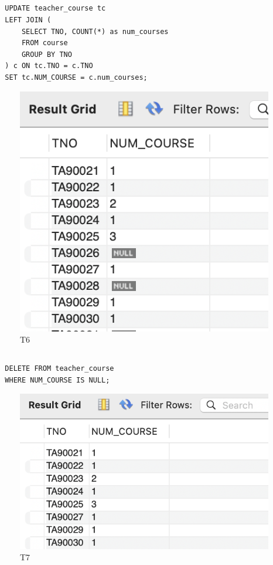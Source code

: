 \documentclass[UTF8]{ctexart}
\begin{document}
\subsection{}
\begin{lstlisting}
  UPDATE teacher_course tc
  LEFT JOIN (
      SELECT TNO, COUNT(*) as num_courses
      FROM course
      GROUP BY TNO
  ) c ON tc.TNO = c.TNO
  SET tc.NUM_COURSE = c.num_courses;
\end{lstlisting}
\begin{figure}[H]
  \centering
  \includegraphics[scale=0.5]{pics/6.png}
  \caption*{T6}
\end{figure}

\subsection{}
\begin{lstlisting}
  DELETE FROM teacher_course
  WHERE NUM_COURSE IS NULL;
\end{lstlisting}
\begin{figure}[H]
  \centering
  \includegraphics[scale=0.5]{pics/7.png}
  \caption*{T7}
\end{figure}
\end{document}
